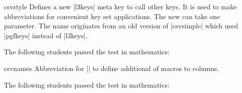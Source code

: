 \documentclass[a4paper,11pt]{ltxdoc}
\begin{document}
\begin{docCommand}{csvstyle}{}
  Defines a new |l3keys| meta key to call other keys. It is used to
  make abbreviations for convenient key set applications.
  The new  can take one parameter. The name 
  originates from an old version of |csvsimple| which used |pgfkeys|
  instead of |l3keys|.

\begin{dispExample}
The following students passed the test in mathematics:\\
\end{dispExample}
\end{docCommand}

\enlargethispage*{1cm}

\begin{docCommand}{csvnames}{}
  Abbreviation for ||
  to define additional  of macros to columns.
\begin{dispExample}
The following students passed the test in mathematics:\\
\end{dispExample}
\end{docCommand}



\clearpage
\end{document}
